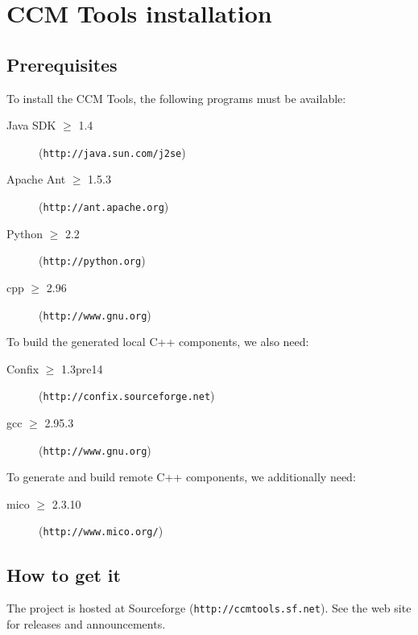 \section{CCM Tools installation}

\subsection{Prerequisites}

To install the CCM Tools, the following programs must be available:
\begin{description}
\item [Java SDK $\ge$ 1.4] ({\tt http://java.sun.com/j2se})
\item [Apache Ant $\ge$ 1.5.3] ({\tt http://ant.apache.org})
\item [Python $\ge$ 2.2] ({\tt http://python.org})
\item [cpp $\ge$ 2.96] ({\tt http://www.gnu.org})
\end{description}

To build the generated local C++ components, we also need:
\begin{description}
\item [Confix $\ge$ 1.3pre14] ({\tt http://confix.sourceforge.net})
\item [gcc $\ge$ 2.95.3] ({\tt http://www.gnu.org})
\end{description}

To generate and build remote C++ components, we additionally need:
\begin{description}
\item [mico $\ge$ 2.3.10] ({\tt http://www.mico.org/})
\end{description}


\subsection{How to get it}

The project is hosted at Sourceforge ({\tt http://ccmtools.sf.net}). See the web
site for releases and announcements.

